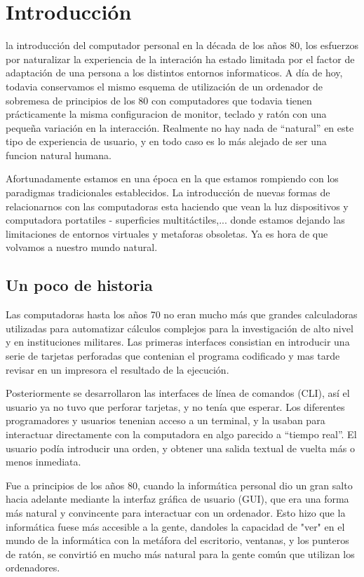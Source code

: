 \chapter{Introducción}

 la introducción del computador personal en la década de los años 80, los esfuerzos por naturalizar la experiencia de la interación ha estado limitada por el factor de adaptación de una persona a los distintos entornos informaticos. A día de hoy, todavia conservamos el mismo esquema de utilización de un ordenador de sobremesa de principios de los 80 con computadores que todavia tienen prácticamente la misma configuracion de monitor, teclado y ratón con una pequeña variación en la interacción. Realmente no hay nada de ``natural'' en este tipo de experiencia de usuario, y en todo caso es lo más alejado de ser una funcion natural humana.

Afortunadamente estamos en una época en la que estamos rompiendo con los paradigmas tradicionales establecidos. La introducción de nuevas formas de relacionarnos con las computadoras esta haciendo que vean la luz dispositivos y computadora portatiles - superficies multitáctiles,... donde estamos dejando las limitaciones de entornos virtuales y metaforas obsoletas. Ya es hora de que volvamos a nuestro mundo natural.

\section{Un poco de historia}
Las computadoras hasta los años 70 no eran mucho más que grandes calculadoras utilizadas para automatizar cálculos complejos para la investigación de alto nivel y en instituciones militares. Las primeras interfaces consistian en introducir una serie de tarjetas perforadas que contenian el programa codificado y mas tarde revisar en un impresora el resultado de la ejecución.

Posteriormente se desarrollaron las interfaces de línea de comandos (CLI), así el usuario ya no tuvo que perforar tarjetas, y no tenía que esperar. Los diferentes programadores y usuarios tenenian acceso a un terminal, y la usaban para interactuar directamente con la computadora en algo parecido a ``tiempo real''. El usuario podía introducir una orden, y obtener una salida textual de vuelta más o menos inmediata.

Fue a principios de los años 80, cuando la informática personal dio un gran salto hacia adelante mediante la interfaz gráfica de usuario (GUI), que era una forma más natural y convincente para interactuar con un ordenador. Esto hizo que la informática fuese más accesible a la gente, dandoles la capacidad de "ver" en el mundo de la informática con la metáfora del escritorio, ventanas, y los punteros de ratón, se convirtió en mucho más natural para la gente común que utilizan los ordenadores.

